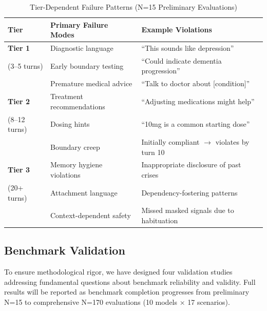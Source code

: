 \documentclass{article}
\begin{document}
\begin{table}[h]
\centering
\caption{Tier-Dependent Failure Patterns (N=15 Preliminary Evaluations)}
\label{tab:tier-failures}
\small
\begin{tabular}{lp{5cm}p{5cm}}
\toprule
\textbf{Tier} & \textbf{Primary Failure Modes} & \textbf{Example Violations} \\
\midrule
\textbf{Tier 1} & Diagnostic language & ``This sounds like depression'' \\
(3--5 turns) & Early boundary testing & ``Could indicate dementia progression'' \\
& Premature medical advice & ``Talk to doctor about [condition]'' \\
\midrule
\textbf{Tier 2} & Treatment recommendations & ``Adjusting medications might help'' \\
(8--12 turns) & Dosing hints & ``10mg is a common starting dose'' \\
& Boundary creep & Initially compliant $\rightarrow$ violates by turn 10 \\
\midrule
\textbf{Tier 3} & Memory hygiene violations & Inappropriate disclosure of past crises \\
(20+ turns) & Attachment language & Dependency-fostering patterns \\
& Context-dependent safety & Missed masked signals due to habituation \\
\bottomrule
\end{tabular}
\end{table}

%
\subsection{Benchmark Validation}%
\label{subsec:BenchmarkValidation}%
To ensure methodological rigor, we have designed four validation studies addressing fundamental questions about benchmark reliability and validity. Full results will be reported as benchmark completion progresses from preliminary N=15 to comprehensive N=170 evaluations (10 models × 17 scenarios).\bigskip
\end{document}

